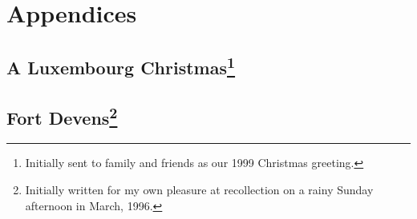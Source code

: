 \part*{Appendices}\label{appendices}
\appendix

\chapter[A Luxembourg Christmas]{A Luxembourg Christmas\footnote{Initially sent to family and friends as our 1999 Christmas greeting.}}\label{luxembourg-christmas}


\chapter[Fort Devens]{Fort Devens\footnote{Initially written for my own pleasure at recollection on a rainy Sunday afternoon in March, 1996.}}\label{fort-devens}


